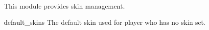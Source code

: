 This module provides skin management.


\begin{Configuration}
    \item[default\_skins]{
        The default skin used for player who has no skin set.
    }
\end{Configuration}